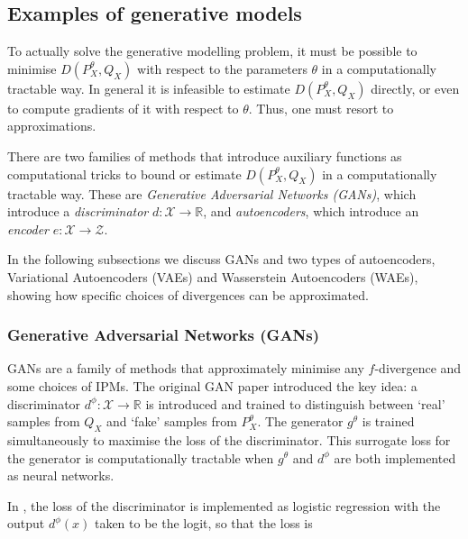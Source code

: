 

\subsection{Examples of generative models}

To actually solve the generative modelling problem, it must be possible to minimise $D(P^\theta_X, Q_X)$ with respect to the parameters $\theta$ in a computationally tractable way.
In general it is infeasible to estimate $D(P^\theta_X, Q_X)$ directly, or even to compute gradients of it with respect to $\theta$. 
Thus, one must resort to approximations.


There are two families of methods that introduce auxiliary functions as computational tricks to bound or estimate $D(P^\theta_X, Q_X)$ in a computationally tractable way.
These are \emph{Generative Adversarial Networks (GANs)}, which introduce a \emph{discriminator} $d:\mathcal{X} \to \mathbb{R}$, and \emph{autoencoders}, which introduce an \emph{encoder} $e:\mathcal{X} \to \mathcal{Z}$.

In the following subsections we discuss GANs and two types of autoencoders, Variational Autoencoders (VAEs) and Wasserstein Autoencoders (WAEs), showing how specific choices of divergences can be approximated.

\subsubsection{Generative Adversarial Networks (GANs)}

GANs are a family of methods that approximately minimise any $f$-divergence and some choices of IPMs. 
The original GAN paper \citep{goodfellow} introduced the key idea: a discriminator $d^\phi: \mathcal{X} \to \mathbb{R}$ is introduced and trained to distinguish between `real' samples from $Q_X$ and `fake' samples from $P^\theta_X$. 
The generator $g^\theta$ is trained simultaneously to maximise the loss of the discriminator. 
This surrogate loss for the generator is computationally tractable when $g^\theta$ and $d^\phi$ are both implemented as neural networks.

In \cite{goodfellow}, the loss of the discriminator is implemented as logistic regression with the output $d^\phi(x)$ taken to be the logit, so that the loss is

